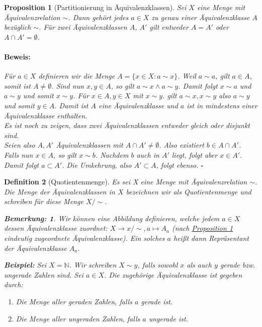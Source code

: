 \documentclass{report}
\newcommand{\IN}[1]{\index{#1|BH}}
\newcommand{\N}{\mathbb{N}}
\theoremstyle{customrem}
\newtheorem*{bem}{Bemerkung:}
\theoremstyle{customdef}
\newtheorem{definition}{Definition}[chapter]
\newtheorem{prop}[definition]{Proposition}
\renewenvironment{proof}{\vspace{-.75cm}\paragraph{Beweis: }}{\vspace{-.5cm}\hfill$\square$}
\begin{document}
	\begin{prop}[Partitionierung in Äquivalenzklassen]
		\label{prop122}
		Sei $X$ eine Menge mit Äquivalenzrelation $\sim$. Dann gehört jedes $a \in X$ zu genau einer Äquivalenzklasse $A$ bezüglich $\sim$. Für zwei Äquivalenzklassen $A$, $A'$ gilt entweder $A = A'$ oder $A\cap A' = \emptyset$.\\
		\begin{proof}
			Für $a \in X$ definieren wir die Menge $A = \{x \in X : a \sim x\}$.
			Weil $a \sim a$, gilt $a \in A$, somit ist $A \neq \emptyset$. 
			Sind nun $x, y \in A$, so gilt $a \sim x \land a \sim y$. Damit folgt $x \sim a$ und $a \sim y$ und somit $x \sim y$.
			Für $x \in A, y \in X$ mit $x \sim y$. gilt $a \sim x, x \sim y$ also $a \sim y$ und somit $y \in A$.
			Damit ist $A$ eine Äquivalenzklasse und $a$ ist in \textit{mindestens} einer Äquivalenzklasse enthalten.\\[.125cm]
			Es ist noch zu zeigen, dass zwei Äquivalenzklassen entweder gleich oder disjunkt sind.\\
			Seien also $A, A'$ Äquivalenzklassen mit $A \cap A' \neq \emptyset$. Also existiert $b \in A\cap A'$. Falls nun $x \in A$, so gilt $x \sim b$. Nachdem $b$ auch in $A'$ liegt, folgt aber $x \in A'$. Damit folgt $a \subset A'$. Die Umkehrung, also $A' \subset A$, folgt ebenso.
		\end{proof}
	\end{prop}
	
	\vspace{.25cm}
	
	\begin{definition}[Quotientenmenge]
		\IN{Menge!Quotienten-}
		Es sei X eine Menge mit Äquivalenzrelation $\sim$. Die Menge der Äquivalenzklassen in $X$ bezeichnen wir  als Quotientenmenge und schreiben für diese Menge $X/{\sim}$.\\
		\begin{bem}
			Wir können eine Abbildung definieren, welche jedem $a \in X$ dessen Äquivalenzklasse zuordnet:
			$X \to x/{\sim}, a \mapsto A_a$ (nach \hyperref[prop122]{Proposition \ref{prop122}} eindeutig zugeordnete Äquivalenzklasse).
			Ein solches $a$ heißt dann Repräsentant der Äquivalenzklasse $A_a$.\\
		\end{bem}
		\noindent\textbf{Beispiel: }
		Sei $X = \N$. Wir schreiben $X \sim y$, falls sowohl $x$ als auch $y$ gerade bzw. ungerade Zahlen sind.
		Sei $a \in X$. Die zugehörige Äquivalenzklasse ist gegeben durch:
		\begin{enumerate}[leftmargin=3cm]
			\itemsep0cm
			\item Die Menge aller geraden Zahlen, falls $a$ gerade ist.
			\item Die Menge aller ungeraden Zahlen, falls $a$ ungerade ist.
		\end{enumerate}
	\end{definition}
\end{document}
